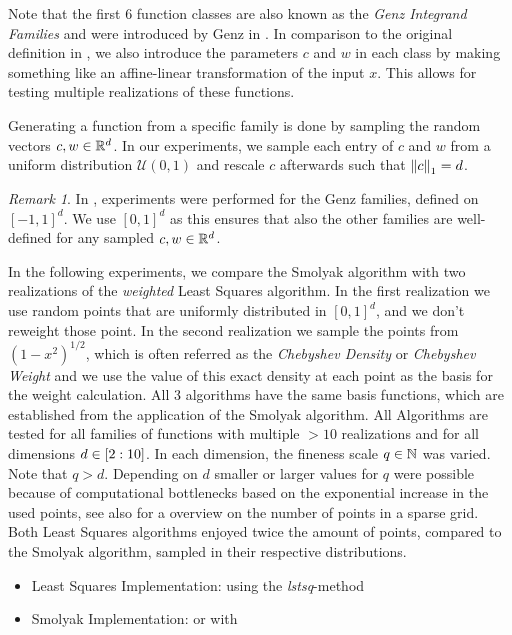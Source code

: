 \documentclass[12pt, oneside]{amsart}
\theoremstyle{definition}
\theoremstyle{remark}
\newtheorem{remark}[thm]{Remark}
\numberwithin{equation}{section}
\begin{document}
Note that the first $6$ function classes are also known as the \emph{Genz 
Integrand Families} and were introduced by Genz in \cite{GenzTesting_1984, 
GenzPackage_1987}. In comparison to the original definition in 
\cite{Simulationlib_2013}, we also introduce the parameters $c$ and $w$ in 
each class by making something like an affine-linear transformation of the 
input $x$. 
This allows for testing multiple realizations of these functions. 

Generating a function from a specific family is done 
by sampling the random vectors $c, w \in\R^d$. In our experiments, we sample 
each entry of $c$ and $w$ from a uniform distribution $\mathcal{U}(0,1)$ and 
rescale $c$ afterwards such that $\norm[1]{c}=d$.

\begin{remark}
	In \cite{BarthelmannHighDim_2000}, experiments were performed for the Genz 
	families, defined on $[-1,1]^d$. We use $[0,1]^d$ as this ensures that also 
	the other families are well-defined for any sampled $c,w\in\R^d$.
\end{remark}

In the following experiments, we compare the Smolyak algorithm with two 
realizations of the \emph{weighted} Least Squares algorithm. In the first 
realization we use random points that are uniformly distributed in $[0,1]^d$, 
and we don't reweight those point. In the second realization we sample the 
points from $(1-x^2)^{1/2}$, which is often referred as the 
\emph{Chebyshev Density} or \emph{Chebyshev Weight} and we use the value of 
this exact density at each point as the basis for the weight calculation. 
All 3 algorithms have the same basis functions, which are established from the 
application of the Smolyak algorithm. 
All Algorithms are tested for all families of functions with multiple $>10$ 
realizations and for all dimensions $d\in \indexset[2]{10}$. In each dimension, 
the fineness scale $q\in\N$ was varied. Note that $q>d$. Depending on $d$ 
smaller or larger values for $q$ were possible because of computational 
bottlenecks based on the exponential increase in the used points, see also 
\cite{BurkardtCounting_2014} for a overview on the number of points in a sparse 
grid. Both Least Squares algorithms enjoyed twice the amount of points, 
compared to the Smolyak algorithm, sampled in their respective distributions.

\begin{itemize}
	\item Least Squares Implementation: \cite{HarrisNumpy_2020} using the 
	\emph{lstsq}-method
	\item Smolyak Implementation: \cite{TasmanianLibrary_2013} or 
	\cite{JuddSmolyak_2014} with \cite{Coleman_SmoylakGithub_2013}
\end{itemize}
\end{document}
